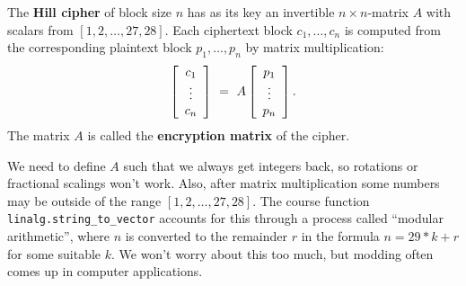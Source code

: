 \documentclass{ximera}
\begin{document}
\begin{definition}\label{def:hill-cipher}
  The \textbf{Hill cipher} of block size $n$ has as its key an
  invertible $n\times n$-matrix $A$ with scalars from $[1, 2, \ldots, 27, 28]$. Each
  ciphertext block $c_1,\ldots,c_n$ is computed from the corresponding
  plaintext block $p_1,\ldots,p_n$ by matrix multiplication:
  \begin{equation*}
    \startmat{c}c_1\\\vdots\\c_n\stopmat
    ~=~ A\startmat{c}p_1\\\vdots\\p_n\stopmat.
  \end{equation*}
  The matrix $A$ is called the \textbf{encryption matrix} of the cipher.

  \begin{remark}
    We need to define $A$ such that we always get integers back, so rotations or fractional scalings won't work. Also, after matrix multiplication some numbers may be outside of the range $[1, 2, \ldots, 27, 28]$. The course function \texttt{linalg.string\_to\_vector} accounts for this through a process called ``modular arithmetic'', where $n$ is converted to the remainder $r$ in the formula $n=29*k+r$ for some suitable $k$. We won't worry about this too much, but modding often comes up in computer applications.
  \end{remark}
\end{definition}
\end{document}
